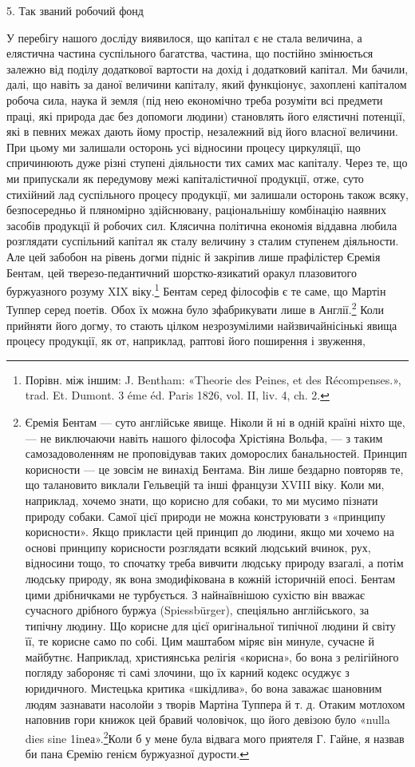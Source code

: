 5. Так званий робочий фонд

У перебігу нашого досліду виявилося, що капітал є не стала
величина, а елястична частина суспільного багатства, частина,
що постійно змінюється залежно від поділу додаткової вартости
на дохід і додатковий капітал. Ми бачили, далі, що навіть за
даної величини капіталу, який функціонує, захоплені капіталом
робоча сила, наука й земля (під нею економічно треба розуміти
всі предмети праці, які природа дає без допомоги людини) становлять
його елястичні потенції, які в певних межах дають йому
простір, незалежний від його власної величини. При цьому ми
залишали осторонь усі відносини процесу циркуляції, що спричинюють
дуже різні ступені діяльности тих самих мас капіталу.
Через те, що ми припускали як передумову межі капіталістичної
продукції, отже, суто стихійний лад суспільного процесу продукції,
ми залишали осторонь також всяку, безпосередньо й пляномірно
здійснювану, раціональнішу комбінацію наявних засобів
продукції й робочих сил. Клясична політична економія віддавна
любила розглядати суспільний капітал як сталу величину
з сталим ступенем діяльности. Але цей забобон на рівень догми
підніс й закріпив лише прафілістер Єремія Бентам, цей тверезо-педантичний
шорстко-язикатий оракул плазовитого буржуазного
розуму XIX віку.\footnote{
Порівн. між іншим: J. Bentham: «Theorie des Peines, et des Récompenses.»,
trad. Et. Dumont. 3 éme éd. Paris 1826, vol. II, liv. 4, ch. 2.
} Бентам серед філософів є те
саме, що Мартін Туппер серед поетів. Обох їх можна було
зфабрикувати лише в Англії.\footnote{
Єремія Бентам — суто англійське явище. Ніколи й ні в одній
країні ніхто ще, — не виключаючи навіть нашого філософа Хрістіяна
Вольфа, — з таким самозадоволенням не проповідував таких доморослих
банальностей. Принцип корисности — це зовсім не винахід Бентама.
Він лише бездарно повторяв те, що талановито виклали Гельвецій та
інші французи XVIII віку. Коли ми, наприклад, хочемо знати, що корисно
для собаки, то ми мусимо пізнати природу собаки. Самої цієї природи
не можна конструювати з «принципу корисности». Якщо прикласти
цей принцип до людини, якщо ми хочемо на основі принципу корисности
розглядати всякий людський вчинок, рух, відносини тощо,
то спочатку треба вивчити людську природу взагалі, а потім людську
природу, як вона змодифікована в кожній історичній епосі. Бентам цими
дрібничками не турбується. З найнаївнішою сухістю він вважає сучасного
дрібного буржуа (Spiessbürger), спеціяльно англійського, за типічну
людину. Що корисне для цієї оригінальної типічної людини й світу її,
те корисне само по собі. Цим маштабом міряє він минуле, сучасне й майбутнє.
Наприклад, християнська релігія «корисна», бо вона з релігійного
погляду забороняє ті самі злочини, що їх карний кодекс осуджує з
юридичного. Мистецька критика «шкідлива», бо вона заважає шановним
людям зазнавати насолойи з творів Мартіна Туппера й т. д. Отаким мотлохом
наповнив гори книжок цей бравий чоловічок, що його девізою було
«nulla dies sine 1іnеа».\footnote*{
— жодного дня без рядка. Ред.
}Коли б у мене була відвага мого приятеля Г. Гайне,
я назвав би пана Єремію генієм буржуазної дурости.
} Коли прийняти його догму, то
стають цілком незрозумілими найзвичайнісінькі явища процесу
продукції, як от, наприклад, раптові його поширення і звуження,
\parbreak{}  %
